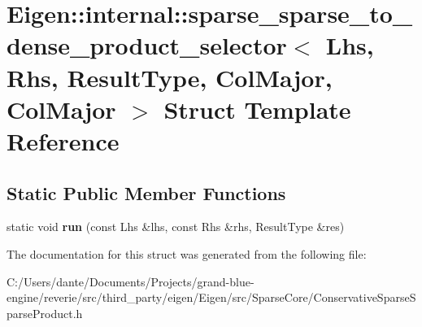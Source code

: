 \hypertarget{struct_eigen_1_1internal_1_1sparse__sparse__to__dense__product__selector_3_01_lhs_00_01_rhs_00_0b0481ed72407c1b6a48b36ffd79869ef}{}\section{Eigen\+::internal\+::sparse\+\_\+sparse\+\_\+to\+\_\+dense\+\_\+product\+\_\+selector$<$ Lhs, Rhs, Result\+Type, Col\+Major, Col\+Major $>$ Struct Template Reference}
\label{struct_eigen_1_1internal_1_1sparse__sparse__to__dense__product__selector_3_01_lhs_00_01_rhs_00_0b0481ed72407c1b6a48b36ffd79869ef}
\subsection*{Static Public Member Functions}
\begin{DoxyCompactItemize}
\item 
\mbox{\label{struct_eigen_1_1internal_1_1sparse__sparse__to__dense__product__selector_3_01_lhs_00_01_rhs_00_0b0481ed72407c1b6a48b36ffd79869ef_ace82aba2b31b9794137257c6663f0ce2}} 
static void {\bfseries run} (const Lhs \&lhs, const Rhs \&rhs, Result\+Type \&res)
\end{DoxyCompactItemize}


The documentation for this struct was generated from the following file\+:\begin{DoxyCompactItemize}
\item 
C\+:/\+Users/dante/\+Documents/\+Projects/grand-\/blue-\/engine/reverie/src/third\+\_\+party/eigen/\+Eigen/src/\+Sparse\+Core/Conservative\+Sparse\+Sparse\+Product.\+h\end{DoxyCompactItemize}
